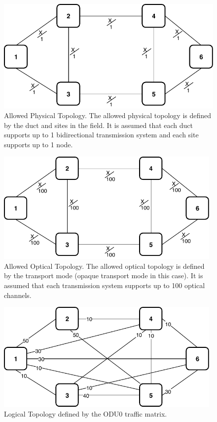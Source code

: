 \begin{figure}[h!]
\centering
\includegraphics[width=12cm]{sdf/ilp/opaque_survivability/figures/allowed_physical_topology}
\caption{Allowed Physical Topology. The allowed physical topology is defined by the duct and sites in the field. It is assumed that each duct supports up to 1 bidirectional transmission system and each site supports up to 1 node.}
\label{allowed_physical_medium}
\end{figure}

\begin{figure}[h!]
\centering
\includegraphics[width=11cm]{sdf/ilp/opaque_survivability/figures/allowed_optical_topology}
\caption{Allowed Optical Topology. The allowed optical topology is defined by the transport mode (opaque transport mode in this case). It is assumed that each transmission system supports up to 100 optical channels.}
\label{allowed_optical_medium}
\end{figure}

\begin{figure}[h!]
\centering
\includegraphics[width=11cm]{sdf/ilp/opaque_survivability/figures/logical_topology_ODU0_medium}
\caption{Logical Topology defined by the ODU0 traffic matrix.}
\label{logical_ODU0_medium}
\end{figure}

